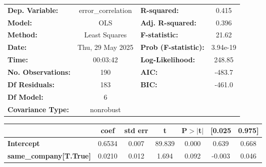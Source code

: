 \begin{center}
\begin{tabular}{lclc}
\toprule
\textbf{Dep. Variable:}                                                        & error\_correlation & \textbf{  R-squared:         } &     0.415   \\
\textbf{Model:}                                                                &        OLS         & \textbf{  Adj. R-squared:    } &     0.396   \\
\textbf{Method:}                                                               &   Least Squares    & \textbf{  F-statistic:       } &     21.62   \\
\textbf{Date:}                                                                 &  Thu, 29 May 2025  & \textbf{  Prob (F-statistic):} &  3.94e-19   \\
\textbf{Time:}                                                                 &      00:03:42      & \textbf{  Log-Likelihood:    } &    248.85   \\
\textbf{No. Observations:}                                                     &          190       & \textbf{  AIC:               } &    -483.7   \\
\textbf{Df Residuals:}                                                         &          183       & \textbf{  BIC:               } &    -461.0   \\
\textbf{Df Model:}                                                             &            6       & \textbf{                     } &             \\
\textbf{Covariance Type:}                                                      &     nonrobust      & \textbf{                     } &             \\
\bottomrule
\end{tabular}
\begin{tabular}{lcccccc}
                                                                               & \textbf{coef} & \textbf{std err} & \textbf{t} & \textbf{P$> |$t$|$} & \textbf{[0.025} & \textbf{0.975]}  \\
\midrule
\textbf{Intercept}                                                             &       0.6534  &        0.007     &    89.839  &         0.000        &        0.639    &        0.668     \\
\textbf{same\_company[T.True]}                                                 &       0.0210  &        0.012     &     1.694  &         0.092        &       -0.003    &        0.046     \\

\end{tabular}
\end{center}
